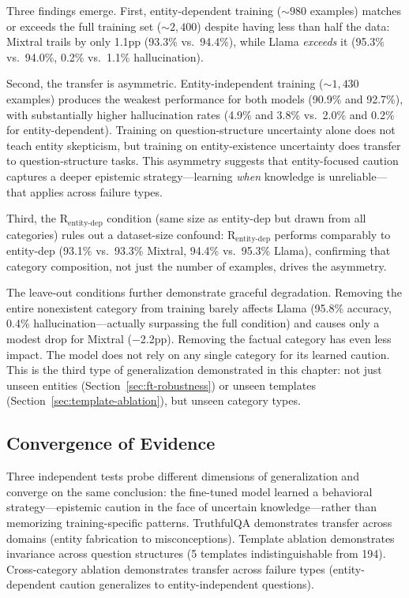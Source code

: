 Three findings emerge. First, entity-dependent training (${\sim}980$ examples) matches or exceeds the full training set (${\sim}2{,}400$) despite having less than half the data: Mixtral trails by only 1.1pp (93.3\% vs.\ 94.4\%), while Llama \emph{exceeds} it (95.3\% vs.\ 94.0\%, 0.2\% vs.\ 1.1\% hallucination).

Second, the transfer is asymmetric. Entity-independent training (${\sim}1{,}430$ examples) produces the weakest performance for both models (90.9\% and 92.7\%), with substantially higher hallucination rates (4.9\% and 3.8\% vs.\ 2.0\% and 0.2\% for entity-dependent). Training on question-structure uncertainty alone does not teach entity skepticism, but training on entity-existence uncertainty does transfer to question-structure tasks. This asymmetry suggests that entity-focused caution captures a deeper epistemic strategy---learning \emph{when} knowledge is unreliable---that applies across failure types.

Third, the R$_{\text{entity-dep}}$ condition (same size as entity-dep but drawn from all categories) rules out a dataset-size confound: R$_{\text{entity-dep}}$ performs comparably to entity-dep (93.1\% vs.\ 93.3\% Mixtral, 94.4\% vs.\ 95.3\% Llama), confirming that category composition, not just the number of examples, drives the asymmetry.

The leave-out conditions further demonstrate graceful degradation. Removing the entire nonexistent category from training barely affects Llama (95.8\% accuracy, 0.4\% hallucination---actually surpassing the full condition) and causes only a modest drop for Mixtral ($-$2.2pp). Removing the factual category has even less impact. The model does not rely on any single category for its learned caution. This is the third type of generalization demonstrated in this chapter: not just unseen entities (Section~\ref{sec:ft-robustness}) or unseen templates (Section~\ref{sec:template-ablation}), but unseen category types.

\subsection{Convergence of Evidence}
\label{sec:convergence}

Three independent tests probe different dimensions of generalization and converge on the same conclusion: the fine-tuned model learned a behavioral strategy---epistemic caution in the face of uncertain knowledge---rather than memorizing training-specific patterns. TruthfulQA demonstrates transfer across domains (entity fabrication to misconceptions). Template ablation demonstrates invariance across question structures (5 templates indistinguishable from 194). Cross-category ablation demonstrates transfer across failure types (entity-dependent caution generalizes to entity-independent questions).

